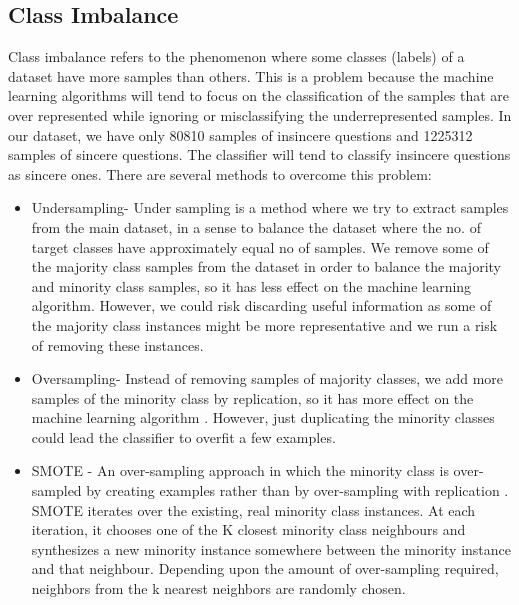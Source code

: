  \subsection{Class Imbalance}
 Class imbalance refers to the phenomenon where some classes (labels) of a dataset have more samples than others. This is a problem because the machine learning algorithms will tend to focus on the classification of the samples that are over represented while ignoring or misclassifying the underrepresented samples. In our dataset, we have only 80810 samples of insincere questions and 1225312 samples of sincere questions. The classifier will tend to classify insincere questions as sincere ones. There are several methods to overcome this problem:
 \begin{itemize}
     \item Undersampling- Under sampling is a method where we try to extract samples from the main dataset, in a sense to balance the dataset where the no. of target classes have approximately equal no of samples. We remove some of the majority class samples from the dataset in order to balance the majority and minority class samples, so it has less effect on the machine learning algorithm. However, we could risk discarding useful information as some of the majority class instances might be more representative and we run a risk of removing these instances. \cite{Liu:2009:ITC:1453254.1453338}
     \item Oversampling- Instead of removing samples of majority classes, we add more samples of the minority class by replication, so it has more effect on the machine learning algorithm \cite{Liu:2009:ITC:1453254.1453338}. However, just duplicating the minority classes could lead the classifier to overfit a few examples.
     \item SMOTE - An over-sampling approach in which the minority class is over-sampled by creating  examples rather than by over-sampling with replication \cite{DBLP:journals/corr/abs-1106-1813}. SMOTE iterates over the existing, real minority class instances. At each iteration, it chooses one of the K closest minority class neighbours and synthesizes a new minority instance somewhere between the minority instance and that neighbour. Depending upon the amount of over-sampling required, neighbors from the k nearest neighbors are randomly chosen.
 \end{itemize}
 
